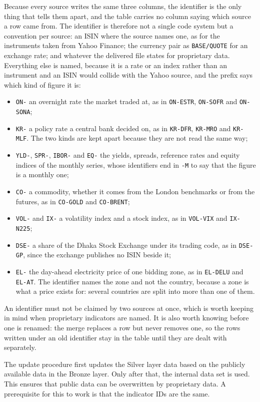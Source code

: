 Because every source writes the same three columns, the identifier is the only thing that tells them apart, and the table carries no column saying which source a row came from. The identifier is therefore not a single code system but a convention per source: an ISIN where the source names one, as for the instruments taken from Yahoo Finance; the currency pair as \verb|BASE/QUOTE| for an exchange rate; and whatever the delivered file states for proprietary data. Everything else is named, because it is a rate or an index rather than an instrument and an ISIN would collide with the Yahoo source, and the prefix says which kind of figure it is:
%
\begin{itemize}
	\item \verb|ON-| an overnight rate the market traded at, as in \verb|ON-ESTR|, \verb|ON-SOFR| and \verb|ON-SONA|;
	\item \verb|KR-| a policy rate a central bank decided on, as in \verb|KR-DFR|, \verb|KR-MRO| and \verb|KR-MLF|. The two kinds are kept apart because they are not read the same way;
	\item \verb|YLD-|, \verb|SPR-|, \verb|IBOR-| and \verb|EQ-| the yields, spreads, reference rates and equity indices of the monthly series, whose identifiers end in \verb|-M| to say that the figure is a monthly one;
	\item \verb|CO-| a commodity, whether it comes from the London benchmarks or from the futures, as in \verb|CO-GOLD| and \verb|CO-BRENT|;
	\item \verb|VOL-| and \verb|IX-| a volatility index and a stock index, as in \verb|VOL-VIX| and \verb|IX-N225|;
	\item \verb|DSE-| a share of the Dhaka Stock Exchange under its trading code, as in \verb|DSE-GP|, since the exchange publishes no ISIN beside it;
	\item \verb|EL-| the day-ahead electricity price of one bidding zone, as in \verb|EL-DELU| and \verb|EL-AT|. The identifier names the zone and not the country, because a zone is what a price exists for: several countries are split into more than one of them.
\end{itemize}
%
An identifier must not be claimed by two sources at once, which is worth keeping in mind when proprietary indicators are named. It is also worth knowing before one is renamed: the merge replaces a row but never removes one, so the rows written under an old identifier stay in the table until they are dealt with separately.

The update procedure first updates the Silver layer data based on the publicly available data in the Bronze layer. Only after that, the internal data set is used. This ensures that public data can be overwritten by proprietary data. A prerequisite for this to work is that the indicator IDs are the same.

